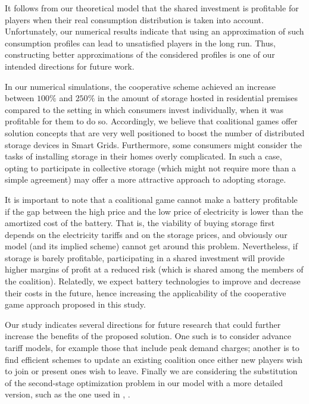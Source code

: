 \documentclass[sigconf, table]{acmart}
\begin{document}
It follows from our theoretical model that the shared investment is profitable for players when their real consumption distribution is taken into account. Unfortunately, our numerical results indicate that using an approximation of such consumption profiles can lead to unsatisfied players in the long run. Thus, constructing better approximations of the considered profiles is one of our intended directions for future work.

In our numerical simulations, the cooperative scheme achieved an increase between $100\%$ and $250\%$ in the amount of storage hosted in residential premises compared to the setting in which consumers invest individually, when it was profitable for them to do so. Accordingly, we believe that coalitional games offer solution concepts that are very well positioned to boost the number of distributed storage devices in Smart Grids. Furthermore, some consumers might consider the tasks of installing storage in their homes overly complicated. In such a case, opting to participate in collective storage (which might not require more than a simple agreement) may offer a more attractive approach to adopting storage.

It is important to note that a coalitional game cannot make a battery profitable if the gap between the high price and the low price of electricity is lower than the amortized cost of the battery. That is, the viability of buying storage first depends on the electricity tariffs and on the storage prices, and obviously our model (and its implied scheme) cannot get around this problem. Nevertheless, if storage is barely profitable, participating in a shared investment will provide higher margins of profit at a reduced risk (which is shared among the members of the coalition).
Relatedly, we expect battery technologies to improve and decrease their costs in the future, hence increasing the applicability of the cooperative game approach proposed in this study.

Our study indicates several directions for future research that could further increase the benefits of the proposed solution.  One such is to consider advance tariff models, for example those that include peak demand charges; another is to find efficient schemes to update an existing coalition once either new players wish to join or present ones wish to leave. Finally we are considering the substitution of the second-stage optimization problem in our model with a more detailed version, such as the one used in \cite{hashmi2019}, \cite{kiedanskiforecast}.
\end{document}
